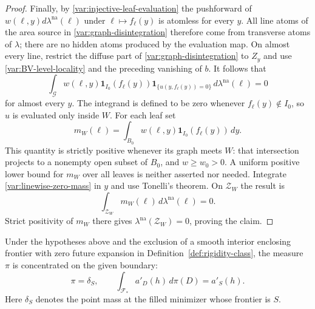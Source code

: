 \begin{proof}
Finally, by \eqref{var:injective-leaf-evaluation} the pushforward
of $w(\ell,y)d\lambda^{\mathrm{na}}(\ell)$ under
$\ell\mapsto f_\ell(y)$ is atomless for every $y$.
All line atoms of the area source in
\eqref{var:graph-disintegration} therefore come from transverse
atoms of $\lambda$; there are no hidden atoms produced by the
evaluation map.  On almost every line, restrict the diffuse part
of \eqref{var:graph-disintegration} to $Z_y$ and use
\eqref{var:BV-level-locality} and the preceding vanishing of $b$.
It follows that
\begin{equation}\label{var:linewise-zero-mass}
 \int_{\mathcal G}w(\ell,y)
       \mathbf1_{I_0}(f_\ell(y))
       \mathbf1_{\{u(y,f_\ell(y))=0\}}
                  \,d\lambda^{\mathrm{na}}(\ell)=0
\end{equation}
for almost every $y$.  The integrand is defined to be zero whenever
$f_\ell(y)\notin I_0$, so $u$ is evaluated only inside $W$.
For each leaf set
\[
 m_W(\ell)=\int_{B_0}w(\ell,y)
                    \mathbf1_{I_0}(f_\ell(y))\,dy.
\]
This quantity is strictly positive whenever its graph meets $W$:
that intersection projects to a nonempty open subset of $B_0$, and
$w\geq w_0>0$.  A uniform positive lower bound for $m_W$ over all
leaves is neither asserted nor needed.  Integrate
\eqref{var:linewise-zero-mass} in $y$ and use Tonelli's theorem.
On $\mathcal Z_W$ the result is
\[
 \int_{\mathcal Z_W}m_W(\ell)\,d\lambda^{\mathrm{na}}(\ell)=0.
\]
Strict positivity of $m_W$ there gives
$\lambda^{\mathrm{na}}(\mathcal Z_W)=0$, proving the claim.
\end{proof}

\begin{proposition}
\label{var:area-elimination}
Under the hypotheses above and the exclusion of a smooth interior
enclosing frontier with zero future expansion in
Definition~\ref{def:rigidity-class}, the measure $\pi$ is
concentrated on the given boundary:
\begin{equation}\label{var:pi-boundary-only}
 \pi=\delta_S,
 \qquad
 \int_{\mathcal F_*}a'_D(h)\,d\pi(D)=a'_S(h).
\end{equation}
Here $\delta_S$ denotes the point mass at the filled minimizer
whose frontier is $S$.
\end{proposition}

